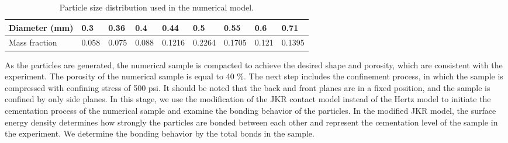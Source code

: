 \documentclass{article}
\begin{document}
\begin{table}[H]
\fontsize{10}{12}\selectfont \caption{Particle size distribution used in the numerical model.}
\begin{centering}
\begin{tabular}{ p{2.5cm} p{1cm} p{1cm}  p{1cm} p{1.25cm} p{1.25cm} p{1.25cm} p{1cm} p{1cm} }
\toprule
 Diameter (mm)    & 0.3 & 0.36 & 0.4 & 0.44 & 0.5 & 0.55 & 0.6 & 0.71\\

\hline %
Mass fraction     & 0.058  & 0.075 &  0.088  & 0.1216 & 0.2264 & 0.1705 & 0.121 & 0.1395 \\
\bottomrule
\end{tabular}
  \label{tab:psd}
\par\end{centering}
\end{table}



As the particles are generated, the numerical sample is compacted to achieve the desired shape and porosity, which are consistent with the experiment. The porosity of the numerical sample is equal to 40 \%. The next step includes the confinement process, in which the sample is compressed with confining stress of 500 psi. It should be noted that the back and front planes are in a fixed position, and the sample is confined by only side planes. In this stage, we use the modification of the JKR contact model \citep{rakhimzhanova2019numerical} instead of the Hertz model \citep{hertz1882ueber} to initiate the cementation process of the numerical sample and examine the bonding behavior of the particles. In the modified JKR model, the surface energy density determines how strongly the particles are bonded between each other and represent the cementation level of the sample in the experiment. We determine the bonding behavior by the total bonds in the sample. 
\end{document}
